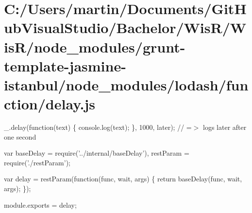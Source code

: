 \hypertarget{_c_1_2_users_2martin_2_documents_2_git_hub_visual_studio_2_bachelor_2_wis_r_2_wis_r_2node_modulee8d69e7d4329a3a7100e9b0d1d7151cf}{}\section{C\+:/\+Users/martin/\+Documents/\+Git\+Hub\+Visual\+Studio/\+Bachelor/\+Wis\+R/\+Wis\+R/node\+\_\+modules/grunt-\/template-\/jasmine-\/istanbul/node\+\_\+modules/lodash/function/delay.\+js}
\+\_\+.\+delay(function(text) \{ console.\+log(text); \}, 1000, \textquotesingle{}later\textquotesingle{}); // =$>$ logs \textquotesingle{}later\textquotesingle{} after one second


\begin{DoxyCodeInclude}
var baseDelay = require(\textcolor{stringliteral}{'../internal/baseDelay'}),
    restParam = require(\textcolor{stringliteral}{'./restParam'});

var delay = restParam(\textcolor{keyword}{function}(func, wait, args) \{
  \textcolor{keywordflow}{return} baseDelay(func, wait, args);
\});

module.exports = delay;
\end{DoxyCodeInclude}
 
